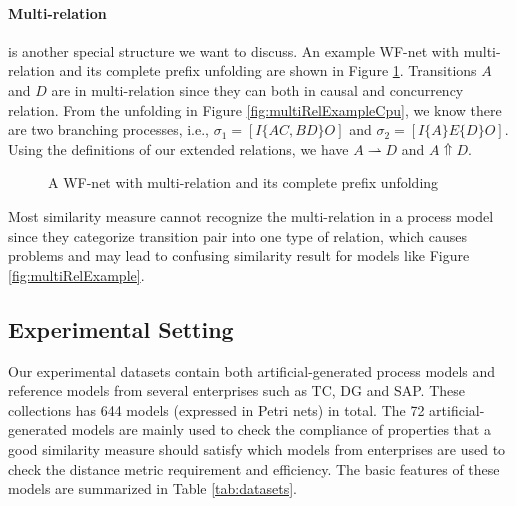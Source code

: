 \documentclass{llncs}
\begin{document}
\paragraph{Multi-relation} is another special structure we want to discuss. An example WF-net with multi-relation and its complete prefix unfolding are shown in Figure \ref{fig:exampleMultiRelation}. Transitions $A$ and $D$ are in multi-relation since they can both in causal and concurrency relation. From the unfolding in Figure \ref{fig:multiRelExampleCpu}, we know there are two branching processes, i.e., $\sigma_{1}=[I\{AC,BD\}O]$ and $\sigma_{2}=[I\{A\}E\{D\}O]$. Using the definitions of our extended relations, we have $A\rightharpoonup D$ and $A\Uparrow D$.

\begin{figure}[ht]
\centering
{}
\caption{A WF-net with multi-relation and its complete prefix unfolding\label{fig:exampleMultiRelation}}
\end{figure}

Most similarity measure cannot recognize the multi-relation in a process model since they categorize transition pair into one type of relation, which causes problems and may lead to confusing similarity result for models like Figure \ref{fig:multiRelExample}.

\subsection{Experimental Setting}\label{subsec:setting}
Our experimental datasets contain both artificial-generated process models and reference models from several enterprises such as TC, DG and SAP. These collections has 644 models (expressed in Petri nets) in total. The 72 artificial-generated models are mainly used to check the compliance of properties that a good similarity measure should satisfy which models from enterprises are used to check the distance metric requirement and efficiency. The basic features of these models are summarized in Table \ref{tab:datasets}.
\end{document}

